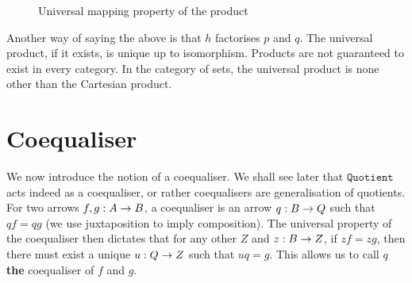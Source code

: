 \documentclass[12pt,twoside,maitrise]{dms}
\theoremstyle{definition}
\numberwithin{equation}{section}
\numberwithin{table}{chapter}
\numberwithin{figure}{chapter}
\newcommand\id[1] {\texttt{#1}}
\begin{document}
\begin{figure}

\caption{Universal mapping property of the product}\label{fig:ump-product}

\end{figure}

Another way of saying the above is that $h$ factorises $p$ and $q$. The
universal product, if it exists, is unique up to isomorphism. Products are not
guaranteed to exist in every category. In the category of sets, the universal
product is none other than the Cartesian product.

\section{Coequaliser}\label{sec:coequaliser}
We now introduce the notion of a coequaliser. We shall see later that
$\id{Quotient}$ acts indeed as a coequaliser, or rather coequalisers are
generalisation of quotients. For two arrows $\oftype{f, g}{A \rightarrow B}$, a
coequaliser is an arrow $\oftype{q}{B \rightarrow Q}$ such that $qf = qg$ (we
use juxtaposition to imply composition). The universal property of the
coequaliser then dictates that for any other $Z$ and $\oftype{z}{B \rightarrow
  Z}$, if $zf = zg$, then there must exist a unique $\oftype{u}{Q \rightarrow
  Z}$ such that $uq = g$. This allows us to call $q$ \textbf{the} coequaliser of
$f$ and $g$.
\end{document}
